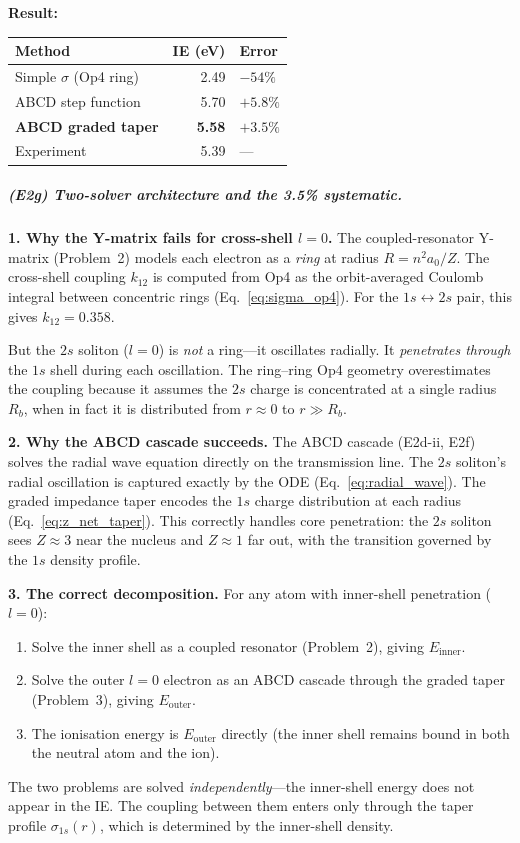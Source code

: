 \noindent\textbf{Result:}
\begin{center}
\small
\renewcommand{\arraystretch}{1.2}
\begin{tabular}{lrl}
\hline
\textbf{Method} & \textbf{IE (eV)}
& \textbf{Error} \\
\hline
Simple $\sigma$ (Op4 ring) & 2.49 & $-54\%$ \\
ABCD step function & 5.70 & $+5.8\%$ \\
\textbf{ABCD graded taper} & \textbf{5.58} & $\mathbf{+3.5\%}$ \\
Experiment & 5.39 & --- \\
\hline
\end{tabular}
\end{center}

\subparagraph{(E2g) Two-solver architecture
and the 3.5\% systematic.}

\noindent\textbf{1. Why the Y-matrix fails for cross-shell $l{=}0$.}
The coupled-resonator Y-matrix (Problem~2) models each
electron as a \emph{ring} at radius $R = n^2 a_0 /Z$.
The cross-shell coupling $k_{12}$ is computed from Op4
as the orbit-averaged Coulomb integral between concentric
rings (Eq.~\ref{eq:sigma_op4}).  For the
$1s \leftrightarrow 2s$ pair, this gives $k_{12} = 0.358$.

But the $2s$ soliton ($l{=}0$) is \emph{not} a ring---it
oscillates radially.  It \emph{penetrates through} the
$1s$ shell during each oscillation.  The ring--ring Op4
geometry overestimates the coupling because it assumes
the $2s$ charge is concentrated at a single radius $R_b$,
when in fact it is distributed from $r \approx 0$ to
$r \gg R_b$.

\noindent\textbf{2. Why the ABCD cascade succeeds.}
The ABCD cascade (E2d-ii, E2f) solves the radial wave
equation directly on the transmission line.  The $2s$
soliton's radial oscillation is captured exactly by the
ODE (Eq.~\ref{eq:radial_wave}).  The graded impedance
taper encodes the $1s$ charge distribution at each radius
(Eq.~\ref{eq:z_net_taper}).  This correctly handles
core penetration: the $2s$ soliton sees $Z \approx 3$
near the nucleus and $Z \approx 1$ far out, with the
transition governed by the $1s$ density profile.

\noindent\textbf{3. The correct decomposition.}
For any atom with inner-shell penetration ($l{=}0$):
\begin{enumerate}
    \item Solve the inner shell as a coupled resonator
          (Problem~2), giving $E_{\text{inner}}$.
    \item Solve the outer $l{=}0$ electron as an ABCD
          cascade through the graded taper
          (Problem~3), giving $E_{\text{outer}}$.
    \item The ionisation energy is $E_{\text{outer}}$
          directly (the inner shell remains bound
          in both the neutral atom and the ion).
\end{enumerate}
The two problems are solved \emph{independently}---the
inner-shell energy does not appear in the IE.  The
coupling between them enters only through the taper
profile $\sigma_{1s}(r)$, which is determined by the
inner-shell density.

